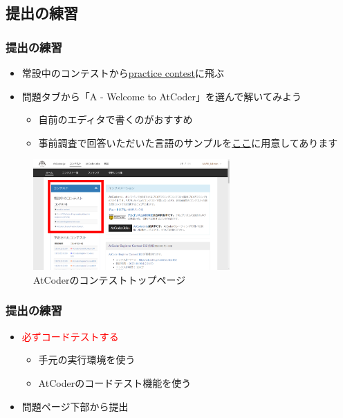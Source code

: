 \documentclass[t, aspectratio=169, dvipdfmx]{beamer}
\begin{document}
\subsection{提出の練習}
\begin{frame}
  \frametitle{提出の練習}
  \begin{itemize}
    \item 常設中のコンテストから\href{https://atcoder.jp/contests/practice}{practice contest}に飛ぶ
    \item 問題タブから「A - Welcome to AtCoder」を選んで解いてみよう
    \begin{itemize}
      \item 自前のエディタで書くのがおすすめ
      \item 事前調査で回答いただいた言語のサンプルを\href{https://github.com/AAAR-Salmon/procon/tree/introduction/introduction/sample}{ここ}に用意してあります
    \end{itemize}
  \end{itemize}
  \begin{figure}
    \includegraphics[height=120pt]{atcoder_home.png}
    \caption{AtCoderのコンテストトップページ}
    \label{practice_contest}
  \end{figure}
\end{frame}

\begin{frame}
  \frametitle{提出の練習}
  \begin{itemize}
    \item \textcolor{red}{必ずコードテストする}
    \begin{itemize}
      \item 手元の実行環境を使う
      \item AtCoderのコードテスト機能を使う
    \end{itemize}
    \item 問題ページ下部から提出
  \end{itemize}
\end{frame}
\end{document}
